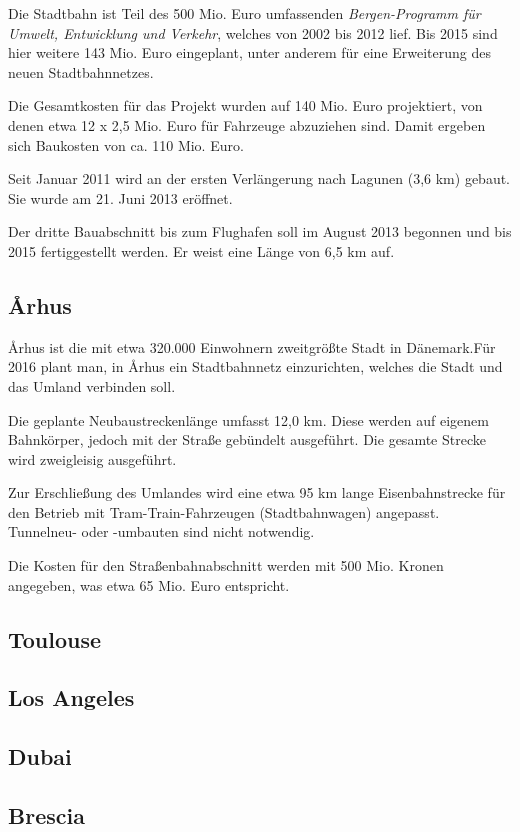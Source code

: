 Die Stadtbahn ist Teil des 500 Mio. Euro umfassenden \emph{Bergen-Programm für Umwelt, Entwicklung
und Verkehr}, welches von 2002 bis 2012 lief. Bis 2015 sind hier weitere 143 Mio. Euro
eingeplant, unter anderem für eine Erweiterung des neuen Stadtbahnnetzes.

Die Gesamtkosten für das Projekt wurden auf 140 Mio. Euro projektiert, von denen etwa
12 x 2,5 Mio. Euro für Fahrzeuge abzuziehen sind. Damit ergeben sich Baukosten von ca. 110
Mio. Euro.

Seit Januar 2011 wird an der ersten Verlängerung nach Lagunen (3,6 km) gebaut. Sie wurde am
21. Juni 2013 eröffnet.

Der dritte Bauabschnitt bis zum Flughafen soll im August 2013 begonnen und bis 2015 fertiggestellt
werden. Er weist eine Länge von 6,5 km auf.

\subsection{Århus}

Århus ist die mit etwa 320.000 Einwohnern zweitgrößte Stadt in Dänemark.Für 2016 plant man,
in Århus ein Stadtbahnnetz einzurichten, welches die Stadt und das Umland verbinden soll.

Die geplante Neubaustreckenlänge umfasst 12,0 km. Diese werden auf eigenem Bahnkörper, jedoch
mit der Straße gebündelt ausgeführt. Die gesamte Strecke wird zweigleisig ausgeführt.

Zur Erschließung des Umlandes wird eine etwa 95 km lange Eisenbahnstrecke für den Betrieb mit
Tram-Train-Fahrzeugen (Stadtbahnwagen) angepasst. Tunnelneu- oder -umbauten sind nicht
notwendig.

Die Kosten für den Straßenbahnabschnitt werden mit 500 Mio. Kronen angegeben, was etwa 65 Mio.
Euro entspricht.

\subsection{Toulouse}


\subsection{Los Angeles}


\subsection{Dubai}


\subsection{Brescia}






\begin{landscape}

\end{landscape}

